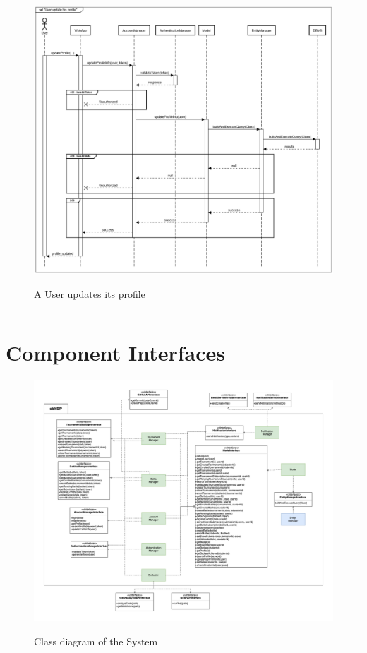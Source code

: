\documentclass{Configuration_Files/Template}
\begin{document}
\begin{figure}[H]
\centering
\includegraphics[scale = 0.33]{Images/diagrams/sequences/updateProfile.png}\\
\caption{A User updates its profile}
\end{figure}

{\color{bluepoli}\rule{\linewidth}{0.1pt}}

\section{Component Interfaces}

\begin{figure}[H]
\centering
\includegraphics[angle=90, scale = 0.4]{Images/diagrams/ComponentSystem.png}\\
\caption{Class diagram of the System}
\end{figure}
\end{document}

